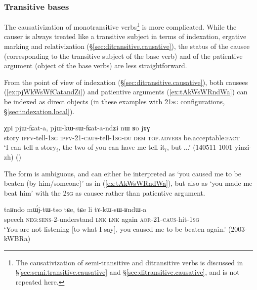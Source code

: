\subsubsection{Transitive bases} \label{sec:sig.caus.tr}
The causativization of monotransitive verbs\footnote{The causativization of semi-transitive and ditransitive verbs is discussed in §\ref{sec:semi.transitive.causative} and §\ref{sec:ditransitive.causative}, and is not repeated here. } is more complicated. While the causer is always treated like a transitive subject in terms of indexation, ergative marking and relativization (§\ref{sec:ditransitive.causative}), the status of the causee (corresponding to the transitive subject of the base verb) and of the patientive argument (object of the base verbs) are less straightforward.

From the point of view of indexation (§\ref{sec:ditransitive.causative}), both causees (\ref{ex:pjWkWsWfCatandZi}) and patientive arguments (\ref{ex:tAkWsWRndWa}) can be indexed as direct objects (in these examples with 2\fl{}\textsc{1sg} configurations, §\ref{sec:indexation.local}).  
 
\begin{exe}
\ex \label{ex:pjWkWsWfCatandZi}
\gll  χpi pjɯ-fɕat-a, pjɯ-kɯ-sɯ-fɕat-a-ndʑi nɯ ʁo jɤɣ \\
story \textsc{ipfv}-tell-\textsc{1sg} \textsc{ipfv}-2\fl{}1-\textsc{caus}-tell-\textsc{1sg}-\textsc{du} \textsc{dem} \textsc{top}.\textsc{advers} be.acceptable:\textsc{fact} \\
\glt `I can tell a story$_i$, the two of you can have me tell it$_i$, but ...' (140511 1001 yinzi-zh)
()
\end{exe}

The form  is ambiguous, and can either be interpreted as `you caused me to be beaten (by him/someone)' as in (\ref{ex:tAkWsWRndWa}), but also as `you made me beat him' with the \textsc{2sg} as causee rather than patientive argument.
 
\begin{exe}
\ex \label{ex:tAkWsWRndWa}
\gll taʁndo mɯ́j-tɯ-tso tɕe, tɕe li tɤ-kɯ-sɯ-ʁndɯ-a \\
speech \textsc{neg}:\textsc{sens}-2-understand \textsc{lnk} \textsc{lnk} again \textsc{aor}-2\fl{}1-\textsc{caus}-hit-\textsc{1sg} \\
\glt `You are not listening [to what I say], you caused me to be beaten again.' (2003-kWBRa)
\end{exe}


